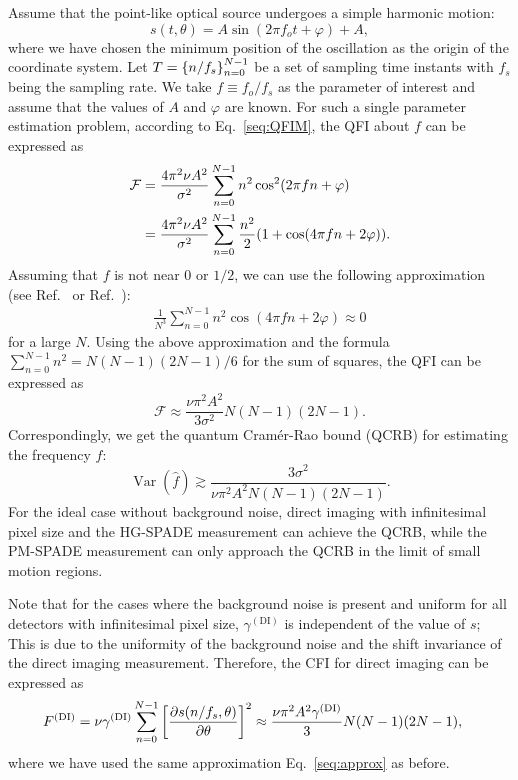 \documentclass[aps,pra,10pt,showpacs,amsmath,amssymb,floatfix,superscriptaddress,twocolumn]{revtex4-2}
\begin{document}
Assume that the point-like optical source undergoes a simple harmonic motion:
\begin{equation}
  s(t,\theta) = A \sin(2\pi f_o t + \varphi) + A,
\end{equation}
where we have chosen the minimum position of the oscillation as the origin of the coordinate system.
Let \(T = \qty{n/f_s}_{n=0}^{N-1}\) be a set of sampling time instants with \( f_s \) being the sampling rate.
We take \(f\equiv f_o/f_s\) as the parameter of interest and assume that the values of \(A\) and \(\varphi\) are known.
For such a single parameter estimation problem, according to Eq.~\eqref{seq:QFIM}, the QFI about \(f\) can be expressed as
\begin{align}
  \mathcal F &= \frac{4\pi^2 \nu A^2}{\sigma^2} \sum_{n=0}^{N-1} n^2 \cos^2(2\pi f n + \varphi) \nonumber \\
  &= \frac{4\pi^2 \nu A^2}{\sigma^2} \sum_{n=0}^{N-1} \frac{n^2}{2} \qty(1 + \cos(4\pi f n + 2\varphi)).
\end{align}
Assuming that $f$ is not near 0 or $1/2$, we can use the following approximation (see Ref.~\cite{supp_Stoica1989} or Ref.~\cite[Sec.~3.11]{supp_Kay1993}):
\begin{align} \label{seq:approx}
  \frac1{N^3}\sum_{n=0}^{N-1} n^2\cos(4\pi f n + 2\varphi) \approx 0
\end{align}
for a large \(N\).
Using the above approximation and the formula \(\sum_{n=0}^{N-1} n^2 = N (N-1) (2 N-1) / 6\) for the sum of squares, the QFI can be expressed as
\begin{equation}
  \mathcal F \approx \frac{\nu \pi^2 A^2}{3\sigma^2} N (N-1) (2 N-1).
\end{equation}
Correspondingly, we get the quantum Cram\'er-Rao bound (QCRB) for estimating the frequency \(f\):
\begin{equation} \label{seq:QCRB_sin}
  \operatorname{Var}(\hat f) \gtrsim \frac{3\sigma^2}{\nu \pi^2 A^2 N(N-1)(2N-1)}.
\end{equation}
For the ideal case without background noise, direct imaging with infinitesimal pixel size and the HG-SPADE measurement can achieve the QCRB, while the PM-SPADE measurement can only approach the QCRB in the limit of small motion regions.

Note that for the cases where the background noise is present and uniform for all detectors with infinitesimal pixel size, \( \gamma^\mathrm{(DI)} \) is independent of the value of \( s \);
This is due to the uniformity of the background noise and the shift invariance of the direct imaging measurement.
Therefore, the CFI for direct imaging can be expressed as
\begin{align}
  F^\mathrm{(DI)} &= \nu \gamma^\mathrm{(DI)} \sum_{n=0}^{N-1} \qty[\pdv{s(n/f_s,\theta)}{\theta}]^2
  \approx \frac{\nu \pi^2 A^2\gamma^\mathrm{(DI)}}{3} N (N-1) (2 N-1),
\end{align}
where we have used the same approximation Eq.~\eqref{seq:approx} as before.
\end{document}
